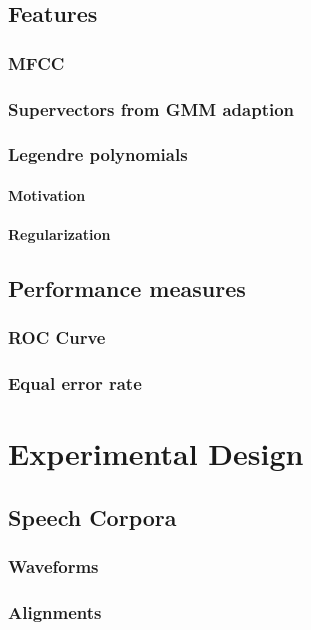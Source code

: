 \documentclass[11pt,a4paper]{tesis}
\begin{document}
	\section{Features}
		\subsection{MFCC}
			
		\subsection{Supervectors from GMM adaption}
			
		\subsection{Legendre polynomials}
			
			\subsubsection{Motivation}
				
			\subsubsection{Regularization}
				
	\section{Performance measures}
		\subsection{ROC Curve}
			
		\subsection{Equal error rate}
			
\chapter{Experimental Design}
	\section{Speech Corpora}
		\subsection{Waveforms}
		\subsection{Alignments}
\end{document}
